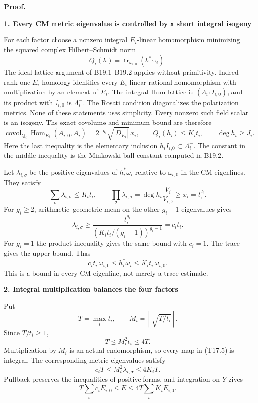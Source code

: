 \textbf{Proof.}

\textbf{1. Every CM metric eigenvalue is controlled by a short integral isogeny}

For each factor choose a nonzero integral \(E_i\)-linear homomorphism minimizing the squared complex Hilbert--Schmidt norm \[
Q_i(h)=\operatorname{tr}_{\omega_{i,0}}(h^*\omega_i).
\] The ideal-lattice argument of B19.1--B19.2 applies without primitivity. Indeed rank-one \(E_i\)-homology identifies every \(E_i\)-linear rational homomorphism with multiplication by an element of \(E_i\). The integral Hom lattice is \((\Lambda_i:I_{i,0})\), and its product with \(I_{i,0}\) is \(\Lambda_i^-\). The Rosati condition diagonalizes the polarization metrics. None of these statements uses simplicity. Every nonzero such field scalar is an isogeny. The exact covolume and minimum bound are therefore \[
\operatorname{covol}_{Q_i}\operatorname{Hom}_{E_i}(A_{i,0},A_i)
=2^{-g_i}\sqrt{|D_{E_i}|}\,x_i,
\qquad Q_i(h_i)\le K_i t_i,
\qquad \deg h_i\ge J_i.
\tag{T17.8}
\] Here the last inequality is the elementary inclusion \(h_i I_{i,0}\subset\Lambda_i^-\). The constant in the middle inequality is the Minkowski ball constant computed in B19.2.

Let \(\lambda_{i,\sigma}\) be the positive eigenvalues of \(h_i^*\omega_i\) relative to \(\omega_{i,0}\) in the CM eigenlines. They satisfy \[
\sum_\sigma\lambda_{i,\sigma}\le K_i t_i,
\qquad
\prod_\sigma\lambda_{i,\sigma}
=\deg h_i\frac{V_i}{V_{i,0}}\ge x_i=t_i^{g_i}.
\tag{T17.9}
\] For \(g_i\ge2\), arithmetic--geometric mean on the other \(g_i-1\) eigenvalues gives \[
\lambda_{i,\sigma}
\ge\frac{t_i^{g_i}}
           {(K_i t_i/(g_i-1))^{g_i-1}}
=c_i t_i.
\] For \(g_i=1\) the product inequality gives the same bound with \(c_i=1\). The trace gives the upper bound. Thus \[
c_i t_i\,\omega_{i,0}
\le h_i^*\omega_i\le K_i t_i\,\omega_{i,0}.
\tag{T17.10}
\] This is a bound in every CM eigenline, not merely a trace estimate.

\textbf{2. Integral multiplication balances the four factors}

Put \[
T=\max_i t_i,\qquad
M_i=\left\lceil\sqrt{T/t_i}\right\rceil.
\tag{T17.11}
\] Since \(T/t_i\ge1\), \[
T\le M_i^2t_i\le4T.
\] Multiplication by \(M_i\) is an actual endomorphism, so every map in (T17.5) is integral. The corresponding metric eigenvalues satisfy \[
c_iT\le M_i^2\lambda_{i,\sigma}\le4K_iT.
\tag{T17.12}
\] Pullback preserves the inequalities of positive forms, and integration on \(Y\) gives \[
T\sum_i c_i E_{i,0}\le E\le4T\sum_iK_iE_{i,0}.
\tag{T17.13}
\]

